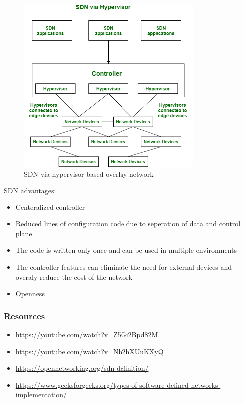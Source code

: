 \documentclass[en]{university}
\begin{document}
\begin{figure}
    \centering
    \includegraphics[width=0.8\textwidth]{resources/SDNviahypervisordrawio.png}
    \caption{SDN via hypervisor-based overlay network}
    \label{fig:sdn-hyper}
\end{figure}
SDN advantages:
\begin{itemize}
    \item Centeralized controller
    \item Reduced lines of configuration code due to seperation of data and control plane
    \item The code is written only once and can be used in multiple environments
    \item The controller features can eliminate the need for external devices and overaly reduce the cost of the network
    \item Openness
\end{itemize}

\subsubsection*{Resources}
\begin{itemize}
    \item \href{https://youtube.com/watch?v=Z5Gi2Bpd82M}{\url{https://youtube.com/watch?v=Z5Gi2Bpd82M}}
    \item \href{https://youtube.com/watch?v=Nh2hXUuKXyQ}{\url{https://youtube.com/watch?v=Nh2hXUuKXyQ}}
    \item \href{https://opennetworking.org/sdn-definition/}{\url{https://opennetworking.org/sdn-definition/}}
    \item \href{https://www.geeksforgeeks.org/types-of-software-defined-networks-implementation/}{\url{https://www.geeksforgeeks.org/types-of-software-defined-networks-implementation/}}
\end{itemize}
\end{document}
